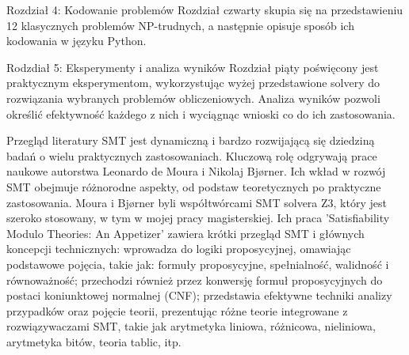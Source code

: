 \documentclass{beamer}
\begin{document}
	
	\begin{frame}{Rozdział 4: Kodowanie problemów}
		Rozdział czwarty skupia się na przedstawieniu 12 klasycznych problemów NP-trudnych, a następnie opisuje sposób ich kodowania w języku Python.
	\end{frame}
	
	
	\begin{frame}{Rodzdiał 5: Eksperymenty i analiza wyników}
		Rozdział piąty poświęcony jest praktycznym eksperymentom, wykorzystując wyżej przedstawione solvery do rozwiązania wybranych problemów obliczeniowych. Analiza wyników pozwoli określić efektywność każdego z nich i wyciągnąc wnioski co do ich zastosowania.
	\end{frame}
	
	
	\begin{frame}{Przegląd literatury}
		SMT jest dynamiczną i bardzo rozwijającą się dziedziną badań o wielu praktycznych zastosowaniach. 
		Kluczową rolę odgrywają prace naukowe autorstwa Leonardo de Moura  i Nikolaj Bjørner. Ich wkład w rozwój SMT obejmuje różnorodne aspekty,  od podstaw teoretycznych po praktyczne zastosowania.
		Moura i Bjørner byli współtwórcami SMT solvera Z3, który jest szeroko stosowany, w tym w mojej pracy magisterskiej. 
		Ich praca 'Satisfiability Modulo Theories: An Appetizer' zawiera krótki przegląd SMT i głównych koncepcji technicznych: wprowadza do logiki proposycyjnej, omawiając podstawowe pojęcia, takie jak: formuły proposycyjne, spełnialność, walidność i równoważność; przechodzi również przez konwersję formuł proposycyjnych do postaci koniunktowej normalnej (CNF); przedstawia efektywne techniki analizy przypadków oraz pojęcie teorii, prezentując różne teorie integrowane z rozwiązywaczami SMT, takie jak arytmetyka liniowa, różnicowa, nieliniowa, arytmetyka bitów, teoria tablic, itp.
	\end{frame}
	
	
\end{document}
